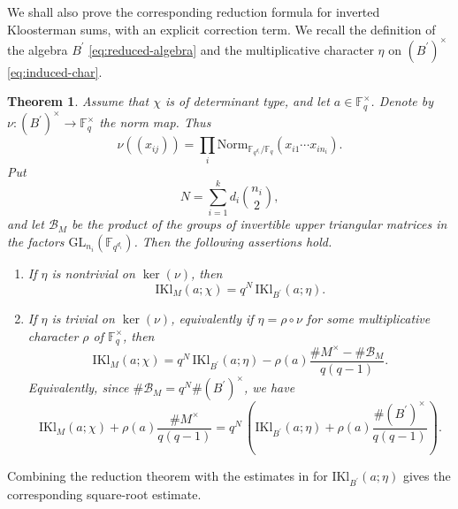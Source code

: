 \documentclass[11pt]{amsart}
\newcommand{\IKl}{\mathrm{IKl}}
\newcommand{\Norm}{\mathrm{Norm}}
\numberwithin{equation}{section}
\theoremstyle{remark}
\theoremstyle{plain}
\newtheorem{theorem}[equation]{Theorem}
\theoremstyle{definition}
\begin{document}
We shall also prove the corresponding reduction formula for inverted
Kloosterman sums, with an explicit correction term.  We recall the
definition of the algebra
\(B^{\prime}\) \eqref{eq:reduced-algebra} and the multiplicative
character \(\eta\) on \((B^{\prime})^{\times}\)
\eqref{eq:induced-char}.


\begin{theorem}\label{thm:intro-inverted-reduction}
Assume that \(\chi\) is of determinant type, and let
\(a\in\mathbb{F}_q^\times\).  Denote by
\(\nu\colon (B^{\prime})^{\times} \to \mathbb{F}_q^{\times}\) the norm
map.  Thus
\[
\nu((x_{ij}))=
\prod_i
\Norm_{\mathbb{F}_{q^{d_i}}/\mathbb{F}_q}(x_{i1}\cdots x_{in_i}).
\]
Put
\[
N=\sum_{i=1}^k d_i\binom{n_i}{2},
\]
and let
\(\mathcal{B}_M\) be the product of the groups of invertible upper
triangular matrices in the factors
\(\mathrm{GL}_{n_i}(\mathbb{F}_{q^{d_i}})\).  Then the following
assertions hold.
\begin{enumerate}
\item If \(\eta\) is nontrivial on \(\ker(\nu)\), then
\[
\IKl_M(a;\chi)=q^N\, \IKl_{B^{\prime}}(a;\eta).
\]
\item If \(\eta\) is trivial on \(\ker(\nu)\), equivalently if
\(\eta = \rho \circ \nu\) for some multiplicative character
\(\rho\) of \(\mathbb{F}_q^\times\), then
\[
\IKl_M(a;\chi)
= q^N\,\IKl_{B^{\prime}}(a;\eta)
-\rho(a)\frac{\#M^\times-\#\mathcal{B}_M}{q(q-1)}.
\]
Equivalently, since \(\#\mathcal{B}_M = q^N\# (B^{\prime})^{\times}\),
we have
\[
\IKl_M(a;\chi) + \rho(a)\frac{\#M^\times}{q(q-1)}
= q^N\,\left(\IKl_{B^{\prime}}(a;\eta)
+\rho(a)\frac{\# ({B}^{\prime})^{\times}}{q(q-1)}\right).
\]
\end{enumerate}
\end{theorem}

Combining the reduction theorem with the estimates in
\cite[Theorems~1.1--1.2]{fu-wan_exotic-inverted-kloosterman} for
\(\IKl_{B^{\prime}}(a;\eta)\) gives the corresponding square-root
estimate.
\end{document}
